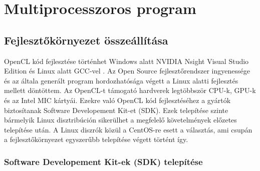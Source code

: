 \chapter{Multiprocesszoros program}

\section{Fejlesztőkörnyezet összeállítása}
OpenCL kód fejlesztése történhet Windows alatt NVIDIA Nsight Visual Studio
Edition \cite{nsight} és Linux alatt GCC-vel \cite{gcc}.
Az Open Source fejlesztőrendszer ingyenessége és az általa generált program hordozhatósága végett
a Linux alatti fejlesztés mellett döntöttem. 
Az OpenCL-t támogató hardverek legtöbbször CPU-k, GPU-k és az Intel MIC
\cite{mic} kártyái.
Ezekre való OpenCL kód fejlesztéséhez a gyártók biztosítanak Software Developement Kit-et (SDK).
Ezek telepítése szinte bármelyik Linux disztribúción sikerülhet a megfelelő követelmények előzetes telepítése után.
A Linux diszrók közül a CentOS-re \cite{centos} esett a választás, ami 
csupán a fejlesztőkörnyezet egyszerűbb telepítése végett történt így.

\subsection{Software Developement Kit-ek (SDK) telepítése} \label{sect:sdk}
